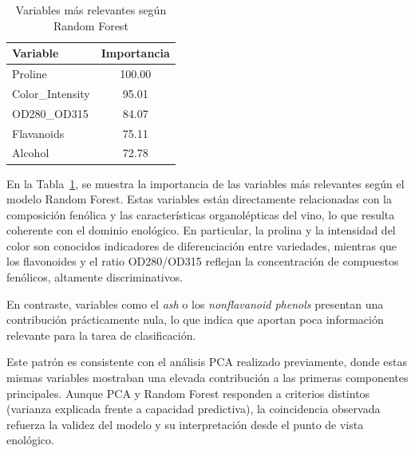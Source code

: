 \vspace{0.3cm}

\begin{table}[h]
\centering
\caption{Variables más relevantes según Random Forest}
\begin{tabular}{l c}
\hline
\textbf{Variable} & \textbf{Importancia} \\
\hline
Proline & 100.00 \\
Color\_Intensity & 95.01 \\
OD280\_OD315 & 84.07 \\
Flavanoids & 75.11 \\
Alcohol & 72.78 \\
\hline
\end{tabular}
\label{tab:importancia_variables}
\end{table}

\vspace{0.3cm}

En la Tabla~\ref{tab:importancia_variables}, se muestra la importancia de las variables más relevantes según el modelo Random Forest. Estas variables están directamente relacionadas con la composición fenólica y las características organolépticas del vino, lo que resulta coherente con el dominio enológico. En particular, la prolina y la intensidad del color son conocidos indicadores de diferenciación entre variedades, mientras que los flavonoides y el ratio OD280/OD315 reflejan la concentración de compuestos fenólicos, altamente discriminativos.

\vspace{0.3cm}

En contraste, variables como el \textit{ash} o los \textit{nonflavanoid phenols} presentan una contribución prácticamente nula, lo que indica que aportan poca información relevante para la tarea de clasificación.

\vspace{0.3cm}

Este patrón es consistente con el análisis PCA realizado previamente, donde estas mismas variables mostraban una elevada contribución a las primeras componentes principales. Aunque PCA y Random Forest responden a criterios distintos (varianza explicada frente a capacidad predictiva), la coincidencia observada refuerza la validez del modelo y su interpretación desde el punto de vista enológico.